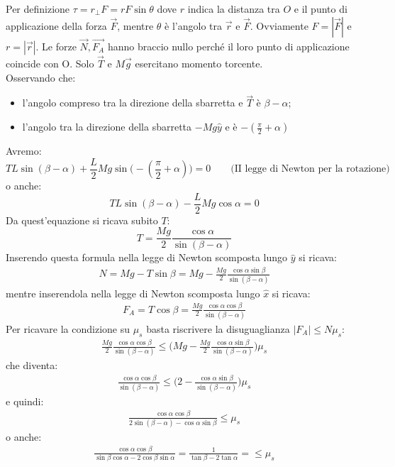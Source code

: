 \documentclass[12pt,a4paper]{book}
\begin{document}
Per definizione $\tau=r_{\perp}F=rF\sin \theta$ dove $r$ indica la distanza tra $O$ e il punto di applicazione della forza $\vec{F}$, mentre $\theta$ è l'angolo tra $\vec{r}$ e $\vec{F}$. Ovviamente $F=|\vec{F}|$ e $r=|\vec{r}|$. Le forze $\vec{N}, \vec{F_A}$ hanno braccio nullo perché il loro punto di applicazione coincide con O. Solo $\vec{T}$ e $M \vec{g}$ esercitano momento torcente. \\

Osservando che: 
\begin{itemize}
\item l'angolo compreso tra la direzione della sbarretta e $\vec{T}$ è $\beta-\alpha$;
\item l'angolo tra la direzione della sbarretta $-Mg\hat{y}$ e è $-(\frac{\pi}{2}+\alpha)$
\end{itemize} 
Avremo:
\begin{equation*}
T L \sin(\beta-\alpha)+\frac{L}{2}Mg\sin\big(-(\frac{\pi}{2}+\alpha)\big)=0 \qquad \text{(II legge di Newton per la rotazione)}
\end{equation*}
o anche:
\begin{equation*}
T L \sin(\beta-\alpha)-\frac{L}{2}Mg\cos\alpha=0 
\end{equation*}
Da quest'equazione si ricava subito $T$: 
\begin{equation*}
T=\frac{Mg}{2}\frac{\cos\alpha}{\sin(\beta-\alpha)}
\end{equation*}
Inserendo questa formula nella legge di Newton scomposta lungo $\hat{y}$ si ricava:
\begin{gather*}
N=Mg-T\sin \beta=Mg-\frac{Mg}{2}\frac{\cos\alpha \sin \beta}{\sin(\beta-\alpha)}
\end{gather*}
mentre inserendola nella legge di Newton scomposta lungo $\hat{x}$ si ricava:
\begin{gather*}
F_A=T \cos \beta = \frac{Mg}{2}\frac{\cos\alpha \cos \beta}{\sin(\beta-\alpha)}
\end{gather*}
Per ricavare la condizione su $\mu_s$ basta riscrivere la disuguaglianza $|F_A|\leq N \mu_s$:
\begin{gather*}
\frac{Mg}{2}\frac{\cos\alpha \cos \beta}{\sin(\beta-\alpha)} \leq \bigg( Mg-\frac{Mg}{2}\frac{\cos\alpha \sin \beta}{\sin(\beta-\alpha)}  \bigg)\mu_s
\end{gather*}
che diventa:
\begin{gather*}
\frac{\cos\alpha \cos \beta}{\sin(\beta-\alpha)} \leq \bigg(2-\frac{\cos\alpha \sin \beta}{\sin(\beta-\alpha)}  \bigg)\mu_s
\end{gather*}
e quindi:
\begin{gather*}
\frac{\cos\alpha \cos \beta}{2\sin(\beta-\alpha)-\cos\alpha \sin \beta} \leq \mu_s
\end{gather*}
o anche:
\begin{gather*}
\frac{\cos\alpha \cos \beta}{\sin\beta\cos \alpha - 2\cos\beta\sin \alpha}=\frac{1}{\tan\beta - 2\tan \alpha}= \leq \mu_s
\end{gather*}
\end{document}
